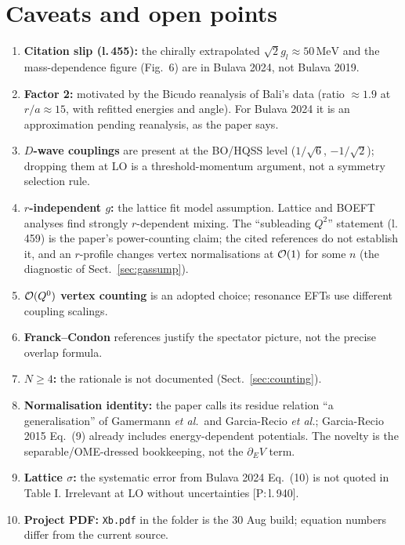 \documentclass[11pt,a4paper]{article}
\newcommand{\tagP}[1]{\textcolor{blue!65!black}{\textsf{\small[P:\,#1]}}}
\renewcommand{\MeV}{\,\mathrm{MeV}}
\begin{document}
\section{Caveats and open points}
\label{sec:caveats}

\begin{enumerate}
\item \textbf{Citation slip (l.\,455):} the chirally extrapolated $\sqrt2g_l\approx50\MeV$ and the mass-dependence figure (Fig.~6) are in Bulava 2024, not Bulava 2019.
\item \textbf{Factor 2:} motivated by the Bicudo reanalysis of Bali's data (ratio $\approx1.9$ at $r/a\approx15$, with refitted energies and angle). For Bulava 2024 it is an approximation pending reanalysis, as the paper says.
\item \textbf{$D$-wave couplings} are present at the BO/HQSS level ($1/\sqrt6$, $-1/\sqrt2$); dropping them at LO is a threshold-momentum argument, not a symmetry selection rule.
\item \textbf{$r$-independent $g$:} the lattice fit model assumption. Lattice and BOEFT analyses find strongly $r$-dependent mixing. The ``subleading $Q^2$'' statement (l.\,459) is the paper's power-counting claim; the cited references do not establish it, and an $r$-profile changes vertex normalisations at ${\cal O}(1)$ for some $n$ (the diagnostic of Sect.~\ref{sec:gassump}).
\item \textbf{${\cal O}(Q^0)$ vertex counting} is an adopted choice; resonance EFTs use different coupling scalings.
\item \textbf{Franck--Condon} references justify the spectator picture, not the precise overlap formula.
\item \textbf{$N\ge4$:} the rationale is not documented (Sect.~\ref{sec:counting}).
\item \textbf{Normalisation identity:} the paper calls its residue relation ``a generalisation'' of Gamermann \emph{et al.}\ and Garcia-Recio \emph{et al.}; Garcia-Recio 2015 Eq.~(9) already includes energy-dependent potentials. The novelty is the separable/OME-dressed bookkeeping, not the $\partial_EV$ term.
\item \textbf{Lattice $\sigma$:} the systematic error from Bulava 2024 Eq.~(10) is not quoted in Table I. Irrelevant at LO without uncertainties \tagP{l.\,940}.
\item \textbf{Project PDF:} \texttt{Xb.pdf} in the folder is the 30 Aug build; equation numbers differ from the current source.
\end{enumerate}
\end{document}

